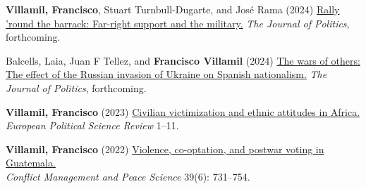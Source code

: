 \documentclass[a4paper, 12pt]{article}
\renewcommand\labelitemi{\textbf{--}}
\begin{document}
\begin{etaremune}[leftmargin=12pt, itemsep=0pt]
\item \textbf{Villamil, Francisco}, Stuart Turnbull-Dugarte, and José Rama (2024) \href{https://doi.org/10.1086/727598}{Rally 'round the barrack: Far-right support and the military.} \textit{The Journal of Politics}, forthcoming.
\item Balcells, Laia, Juan F Tellez, and \textbf{Francisco Villamil} (2024) \href{https://doi.org/10.1086/726939}{The wars of others: The effect of the Russian invasion of Ukraine on Spanish nationalism.} \textit{The Journal of Politics}, forthcoming.
\item \textbf{Villamil, Francisco} (2023) \href{https://doi.org/10.1017/S1755773923000097}{Civilian victimization and ethnic attitudes in Africa.}\\\textit{European Political Science Review} 1--11.
\item \textbf{Villamil, Francisco} (2022) \href{https://journals.sagepub.com/doi/full/10.1177/07388942211066539}{Violence, co-optation, and postwar voting in Guatemala.}\\\textit{Conflict Management and Peace Science} 39(6): 731--754.

\end{etaremune}
\end{document}

